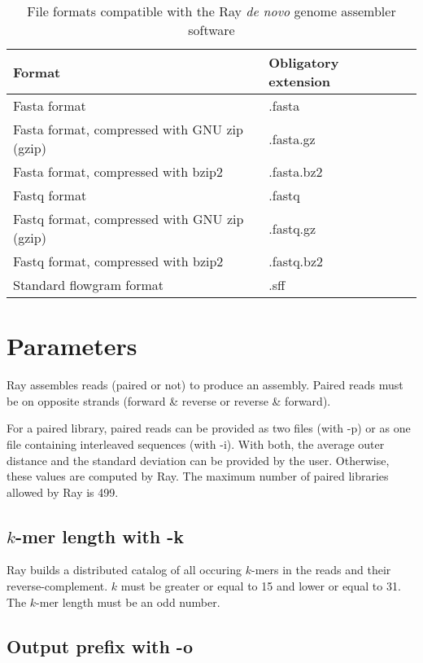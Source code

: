 \documentclass{article}
\begin{document}
\begin{table}[h]
\caption{File formats compatible with the Ray \emph{de novo} genome assembler software}\label{formats}
\begin{tabular}{lll}
\hline
Format & Obligatory extension \\
\hline
Fasta format & .fasta\\
Fasta format, compressed with GNU zip (gzip) & .fasta.gz \\
Fasta format, compressed with bzip2 & .fasta.bz2 \\
Fastq format & .fastq\\
Fastq format, compressed with GNU zip (gzip) & .fastq.gz \\
Fastq format, compressed with bzip2 & .fastq.bz2 \\
Standard flowgram format & .sff \\
\hline
\end{tabular}
\end{table}



\section{Parameters}

Ray assembles reads (paired or not) to produce an assembly.
Paired reads must be on opposite strands (forward \& reverse or reverse \& forward).

For a paired library, paired reads can be provided as two files (with -p) or as one file containing interleaved
sequences (with -i).
With both, the average outer distance and the standard deviation can be provided by the user. Otherwise, these values are
computed by Ray.
The maximum  number of paired libraries allowed by Ray is 499.




\subsection{$k$-mer length with -k}

Ray builds a distributed catalog of all occuring $k$-mers in the reads and their reverse-complement. $k$ must be greater or equal to 15 and lower or equal to 31. The $k$-mer length must be an odd number.

\subsection{Output prefix with -o}
\end{document}

